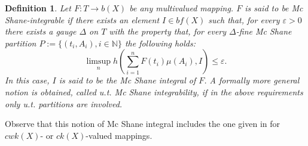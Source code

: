 \documentclass[11pt,a4paper,twoside]{amsart}
\newtheorem{definition}[theorem]{Definition}
\begin{document}
\begin{definition}\label{robanuova}\rm
Let $F:T\to b(X)$ be any multivalued mapping. $F$ is said to be {\em Mc Shane-integrable} if there exists an element $I\in bf(X)$ such that, for every ${\varepsilon}>0$ there exists a gauge $\Delta$ on $T$ with the property that, for every $\Delta$-fine Mc Shane partition $P:=\{(t_i,A_i),i\in \mathbb{N}\}$ the following holds:
$$\limsup_nh(\sum_{i=1}^nF(t_i)\mu(A_i),I)\leq {\varepsilon}.$$ 
In this case, $I$ is said to be the {\em Mc Shane integral} of $F$.
A formally more general notion is obtained, called {\em u.t. Mc Shane integrability}, if in the above requirements only u.t. partitions are involved.
\end{definition}
Observe that this notion of Mc Shane integral includes the one given  in \cite{bs2004}  for $cwk(X)$- or $ck(X)$-valued mappings.
\end{document}
